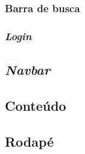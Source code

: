 \subsubsection{Barra de busca}

\subsubsection{\emph{Login}}
\subsection{\emph{Navbar}}
\subsection{Conteúdo}
\subsection{Rodapé}
